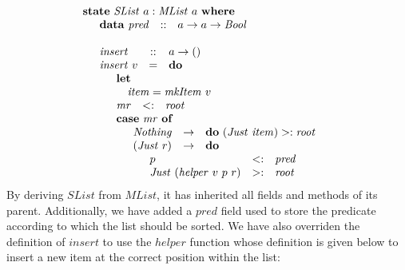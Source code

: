 \documentclass[runningheads,a4paper]{llncs}
\begin{document}
\begin{displaymath}
\begin{array}{l}
\mathbf{state}~\mathit{SList}~a : \mathit{MList}~a~\mathbf{where} \\
\quad \begin{array}{lcl}
\mathbf{data}~\mathit{pred}  & :: & a \to a \to \mathit{Bool}
\end{array}\\\\
\quad \begin{array}{lcl}
\mathit{insert} & :: & a \to ()\\
\mathit{insert}~v & = & \mathbf{do} \\
\multicolumn{3}{l}{\quad \begin{array}{lcl}
\multicolumn{3}{l}{\mathbf{let}}\\
\multicolumn{3}{l}{\quad \mathit{item} = \mathit{mkItem}~v} \\
\mathit{mr} & <: & \mathit{root} \\
\multicolumn{3}{l}{\mathbf{case}~\mathit{mr}~\mathbf{of}} \\
\multicolumn{3}{l}{\quad \begin{array}{lcl}
\mathit{Nothing} & \to & \mathbf{do}~(\mathit{Just}~\mathit{item}) >: \mathit{root} \\
(\mathit{Just}~r) & \to & \mathbf{do} \\
\multicolumn{3}{l}{\quad \begin{array}{lcl}
p & <: & \mathit{pred} \\
\mathit{Just}~(\mathit{helper}~v~p~r) & >: & \mathit{root}
\end{array}}
\end{array}}
\end{array}}
\end{array}
\end{array}
\end{displaymath}
By deriving $\mathit{SList}$ from $\mathit{MList}$, it has inherited all fields and methods of its parent. Additionally, we have added a $\mathit{pred}$ field used to store the predicate according to which the list should be sorted. We have also overriden the definition of $\mathit{insert}$ to use the $\mathit{helper}$ function whose definition is given below to insert a new item at the correct position within the list:
\end{document}
